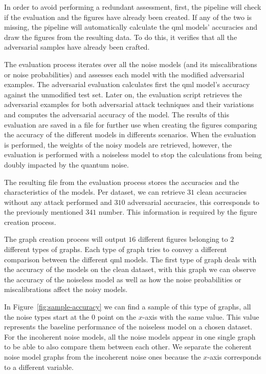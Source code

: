 In order to avoid performing a redundant assessment, first,
the pipeline will check if the evaluation and the figures
have already been created. If any of the two is missing,
the pipeline will automatically calculate the \ac{qml} models'
accuracies and draw the figures from the resulting data. To
do this, it verifies that all the adversarial samples have
already been crafted. \

The evaluation process iterates over all the noise
models (and its miscalibrations or noise probabilities)
and assesses each model with the modified adversarial
examples. The adversarial evaluation calculates first the
\ac{qml} model's accuracy against the unmodified test set.
Later on, the evaluation script retrieves the adversarial
examples for both adversarial attack techniques and their
variations and computes the adversarial accuracy of the model.
The results of this evaluation are saved in a file
for further use when creating the figures comparing the
accuracy of the different models in differents scenarios.
When the evaluation is performed, the weights of the noisy
models are retrieved, however, the evaluation is performed
with a noiseless model to stop the calculations from being
doubly impacted by the quantum noise. \

The resulting file from the evaluation process stores the
accuracies and the characteristics of the models. Per dataset,
we can retrieve \(31\) clean accuracies without any attack
performed and \(310\) adversarial accuracies, this corresponds
to the previously mentioned \(341\) number. This information
is required by the figure creation process. \

The graph creation process will output \(16\) different
figures belonging to \(2\) different types of graphs. Each
type of graph tries to convey a different comparison between
the different \ac{qml} models. The first type of graph deals
with the accuracy of the models on the clean dataset, 
with this graph we can observe the accuracy of the noiseless
model as well as how the noise probabilities or miscalibrations
affect the noisy models. \

In Figure~\ref{fig:sample-accuracy} we
can find a sample of this type of graphs, all the noise types
start at the \(0\) point on the \(x\)-axis with the same value. This
value represents the baseline performance of the noiseless model
on a chosen dataset. For the incoherent noise models, all the
noise models appear in one single graph to be able to also compare
them between each other. We separate the coherent noise model graphs
from the incoherent noise ones because the \(x\)-axis corresponds to
a different variable. \

